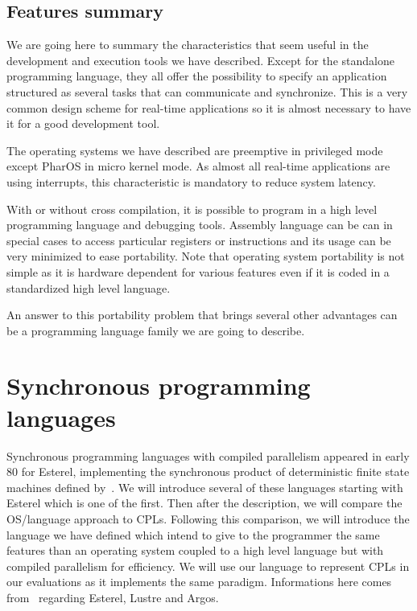 \documentclass[10pt]{report}
\begin{document}
\subsection{Features summary}

We are going here to summary the characteristics that seem useful in the development and execution tools we have described. Except
for the standalone programming language, they all offer the possibility to specify an application structured as several tasks
that can communicate and synchronize. This is a very common design scheme for real-time applications so it is almost necessary
to have it for a good development tool.

The operating systems we have described are preemptive in privileged mode except PharOS in micro kernel mode. As almost all
real-time applications are using interrupts, this characteristic is mandatory to reduce system latency.

With or without cross compilation, it is possible to program in a high level programming language and debugging tools. Assembly
language can be can in special cases to access particular registers or instructions and its usage can be very minimized to ease
portability. Note that operating system portability is not simple as it is hardware dependent for various features even if
it is coded in a standardized high level language.

An answer to this portability problem that brings several other advantages can be a programming language family we are going to
describe.

\section{Synchronous programming languages}

Synchronous programming languages with compiled parallelism appeared in early 80 for Esterel, implementing the synchronous product
of deterministic finite state machines defined by~\cite{ArnoldNivat:82}. We will introduce several of these languages starting with
Esterel which is one of the first. Then after the description, we will compare the OS/language approach to CPLs. Following this
comparison, we will introduce the language we have defined which intend to give to the programmer the same features than an
operating system coupled to a high level language but with compiled parallelism for efficiency. We will use our language to represent
CPLs in our evaluations as it implements the same paradigm. Informations here comes from~\cite{Halbwachs:91} regarding Esterel, Lustre
and Argos.
\end{document}
